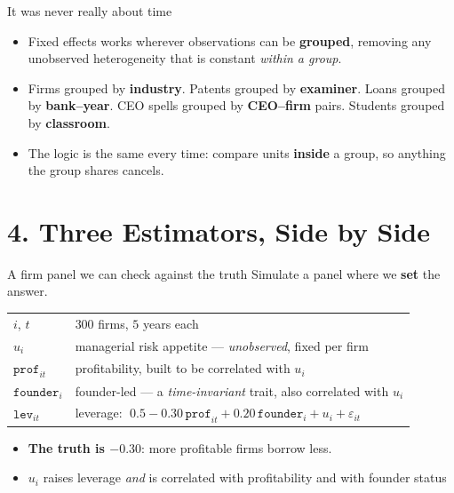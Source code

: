 \documentclass[
  11pt,
  ignorenonframetext,
  aspectratio=169,
]{beamer}
\providecommand{\tightlist}{%
  \setlength{\itemsep}{0pt}\setlength{\parskip}{0pt}}
\begin{document}
\begin{frame}{It was never really about time}
\protect{}\label{it-was-never-really-about-time}
\begin{itemize}
\tightlist
\item
  Fixed effects works wherever observations can be \textbf{grouped},
  removing any unobserved heterogeneity that is constant \emph{within a
  group}.
\item
  Firms grouped by \textbf{industry}. Patents grouped by
  \textbf{examiner}. Loans grouped by \textbf{bank--year}. CEO spells
  grouped by \textbf{CEO--firm} pairs. Students grouped by
  \textbf{classroom}.
\item
  The logic is the same every time: compare units \textbf{inside} a
  group, so anything the group shares cancels.
\end{itemize}
\end{frame}

\section{4. Three Estimators, Side by
Side}\label{three-estimators-side-by-side}

\begin{frame}{A firm panel we can check against the truth}
\protect{}\label{a-firm-panel-we-can-check-against-the-truth}
Simulate a panel where we \textbf{set} the answer.

\begin{center}\small
\begin{tabular}{ll}
\toprule
$i$, $t$ & $300$ firms, $5$ years each \\
$u_i$ & managerial risk appetite --- \emph{unobserved}, fixed per firm \\
$\texttt{prof}_{it}$ & profitability, built to be correlated with $u_i$ \\
$\texttt{founder}_i$ & founder-led --- a \emph{time-invariant} trait, also correlated with $u_i$ \\
$\texttt{lev}_{it}$ & leverage: $\;0.5 - 0.30\,\texttt{prof}_{it} + 0.20\,\texttt{founder}_i + u_i + \varepsilon_{it}$ \\
\bottomrule
\end{tabular}
\end{center}

\begin{itemize}
\tightlist
\item
  \textbf{The truth is \(-0.30\)}: more profitable firms borrow less.
\item
  \(u_i\) raises leverage \emph{and} is correlated with profitability
  and with founder status
\end{itemize}
\end{frame}
\end{document}

